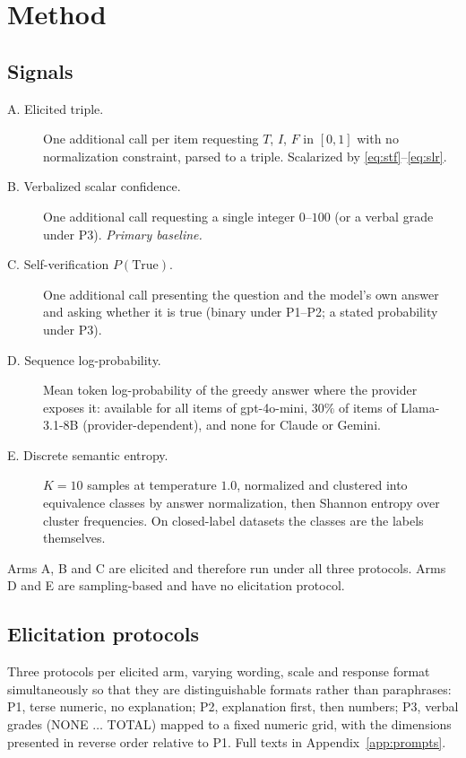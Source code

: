 \documentclass[11pt]{article}
\begin{document}
\section{Method}
\label{sec:method}

\subsection{Signals}
\begin{description}
  \item[A. Elicited triple.] One additional call per item requesting $T$, $I$, $F$ in $[0,1]$
        with no normalization constraint, parsed to a triple. Scalarized by
        \eqref{eq:stf}--\eqref{eq:slr}.
  \item[B. Verbalized scalar confidence.] One additional call requesting a single integer
        $0$--$100$ (or a verbal grade under P3). \emph{Primary baseline.}
  \item[C. Self-verification $P(\text{True})$.] One additional call presenting the question and
        the model's own answer and asking whether it is true (binary under P1--P2; a stated
        probability under P3).
  \item[D. Sequence log-probability.] Mean token log-probability of the greedy answer where the
        provider exposes it: available for all items of gpt-4o-mini, $30\%$ of items of
        Llama-3.1-8B (provider-dependent), and none for Claude or Gemini.
  \item[E. Discrete semantic entropy.] $K=10$ samples at temperature $1.0$, normalized and
        clustered into equivalence classes by answer normalization, then Shannon entropy over
        cluster frequencies. On closed-label datasets the classes are the labels themselves.
\end{description}
Arms A, B and C are elicited and therefore run under all three protocols. Arms D and E are
sampling-based and have no elicitation protocol.

\subsection{Elicitation protocols}
Three protocols per elicited arm, varying wording, scale and response format simultaneously so
that they are distinguishable formats rather than paraphrases: P1, terse numeric, no explanation;
P2, explanation first, then numbers; P3, verbal grades (NONE $\ldots$ TOTAL) mapped to a fixed
numeric grid, with the dimensions presented in reverse order relative to P1. Full texts in
Appendix~\ref{app:prompts}.
\end{document}
